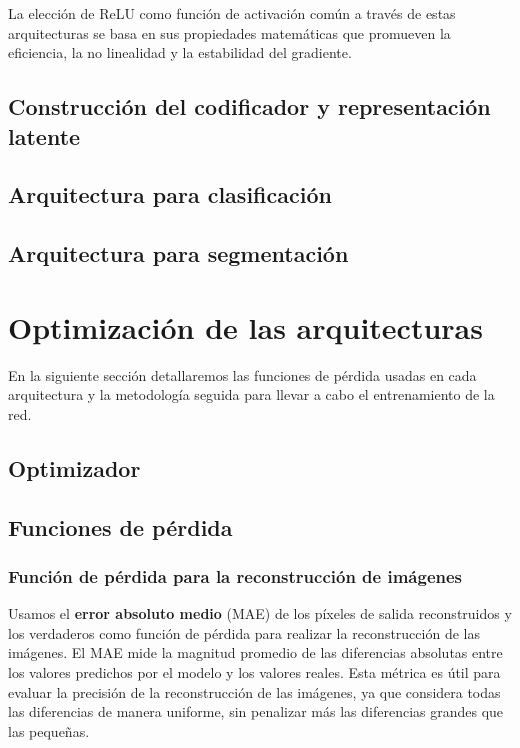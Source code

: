 La elección de ReLU como función de activación común a través de estas arquitecturas se basa en sus propiedades matemáticas que promueven la eficiencia, la no linealidad y la estabilidad del gradiente.


\subsection{Construcción del codificador y representación latente}

\subsection{Arquitectura para clasificación}

\subsection{Arquitectura para segmentación}

\section{Optimización de las arquitecturas}

En la siguiente sección detallaremos las funciones de pérdida usadas en cada arquitectura y la metodología seguida para llevar a cabo el entrenamiento de la red.

\subsection{Optimizador}

\subsection{Funciones de pérdida}

\subsubsection{Función de pérdida para la reconstrucción de imágenes}

Usamos el \textbf{error absoluto medio} (MAE) de los píxeles de salida reconstruidos y los verdaderos como función de pérdida para realizar la reconstrucción de las imágenes. El MAE mide la magnitud promedio de las diferencias absolutas entre los valores predichos por el modelo y los valores reales. Esta métrica es útil para evaluar la precisión de la reconstrucción de las imágenes, ya que considera todas las diferencias de manera uniforme, sin penalizar más las diferencias grandes que las pequeñas.

